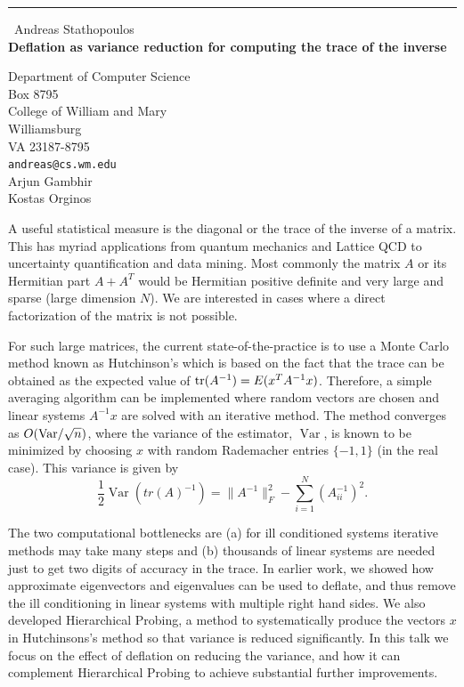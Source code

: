\documentclass{report}
\begin{document}
\begin{center}
\rule{6in}{1pt} \
{\large Andreas Stathopoulos \\
{\bf Deflation as variance reduction for computing the trace of the inverse}}

Department of Computer Science \\ Box 8795 \\ College of William and Mary \\ Williamsburg \\ VA 23187-8795
\\
{\tt andreas@cs.wm.edu}\\
Arjun Gambhir\\
Kostas Orginos\end{center}

A useful statistical measure is the diagonal or the trace of the inverse of
a matrix. This has myriad applications from quantum mechanics and Lattice QCD
to uncertainty quantification and data mining.
Most commonly the matrix $A$ or its Hermitian part $A+A^T$ would be Hermitian
positive definite and very large and sparse (large dimension $N$). We are
interested in cases where a direct factorization of the matrix is not possible.

For such large matrices, the current state-of-the-practice is to use a
Monte Carlo method known as Hutchinson's which is based on the fact that
the trace can be obtained as the expected value of
${\rm tr}(A^{-1}) = E(x^T A^{-1} x)$.
Therefore, a simple averaging algorithm can be implemented where random vectors
are chosen and linear systems $ A^{-1} x$ are solved with an iterative method.
The method converges as $O({\rm Var}/\sqrt{n})$, where the variance of the
estimator, $\operatorname{Var}$, is known to be minimized by choosing $x$ with random
Rademacher entries $\{-1, 1\}$ (in the real case).
This variance is given by
$$ \frac{1}{2}\operatorname{Var}(tr(A)^{-1}) = \|A^{-1}\|^2_F -
\sum_{i=1}^N (A^{-1}_{ii})^2.$$

The two computational bottlenecks are (a) for ill conditioned systems iterative
methods may take many steps and (b) thousands of linear systems are needed just
to get two digits of accuracy in the trace.
In earlier work, we showed how approximate eigenvectors and eigenvalues can
be used to deflate, and thus remove the ill conditioning in linear systems
with multiple right hand sides.
We also developed Hierarchical Probing, a method to systematically produce
the vectors $x$ in Hutchinsons's method so that variance is reduced significantly.
In this talk we focus on the effect of deflation on reducing the variance,
and how it can complement Hierarchical Probing to achieve substantial further
improvements.
\end{document}

